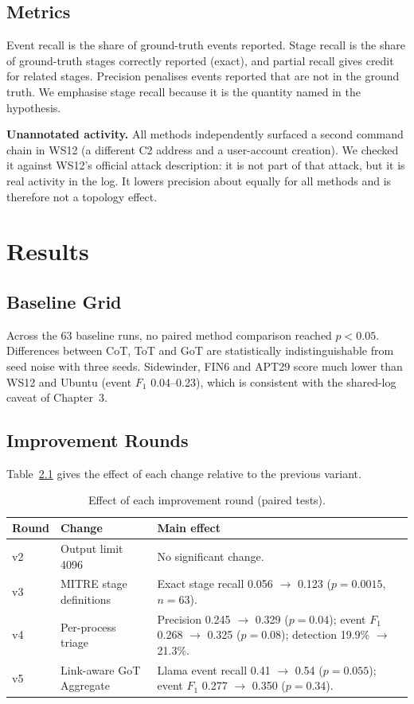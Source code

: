 \documentclass[a4paper, 12pt]{report}
\theoremstyle{definition}
\begin{document}
\section{Metrics}
Event recall is the share of ground-truth events reported. Stage recall is the share of ground-truth stages correctly reported (exact), and partial recall gives credit for related stages. Precision penalises events reported that are not in the ground truth. We emphasise stage recall because it is the quantity named in the hypothesis.

\textbf{Unannotated activity.} All methods independently surfaced a second command chain in WS12 (a different C2 address and a user-account creation). We checked it against WS12's official attack description: it is not part of that attack, but it is real activity in the log. It lowers precision about equally for all methods and is therefore not a topology effect.

\chapter{Results}
\label{chap.6}
\section{Baseline Grid}
Across the 63 baseline runs, no paired method comparison reached $p<0.05$. Differences between CoT, ToT and GoT are statistically indistinguishable from seed noise with three seeds. Sidewinder, FIN6 and APT29 score much lower than WS12 and Ubuntu (event $F_1$ 0.04--0.23), which is consistent with the shared-log caveat of Chapter~3.

\section{Improvement Rounds}
Table~\ref{tab:rounds} gives the effect of each change relative to the previous variant.

\begin{table}[h]
\centering
\caption{Effect of each improvement round (paired tests).}
\label{tab:rounds}
\begin{tabular}{p{2.6cm}p{5.2cm}p{5.2cm}}
\toprule
Round & Change & Main effect \\
\midrule
v2 & Output limit 4096 & No significant change. \\
v3 & MITRE stage definitions & Exact stage recall 0.056 $\to$ 0.123 ($p=0.0015$, $n=63$). \\
v4 & Per-process triage & Precision 0.245 $\to$ 0.329 ($p=0.04$); event $F_1$ 0.268 $\to$ 0.325 ($p=0.08$); detection 19.9\% $\to$ 21.3\%. \\
v5 & Link-aware GoT Aggregate & Llama event recall 0.41 $\to$ 0.54 ($p=0.055$); event $F_1$ 0.277 $\to$ 0.350 ($p=0.34$). \\
\bottomrule
\end{tabular}
\end{table}
\end{document}
